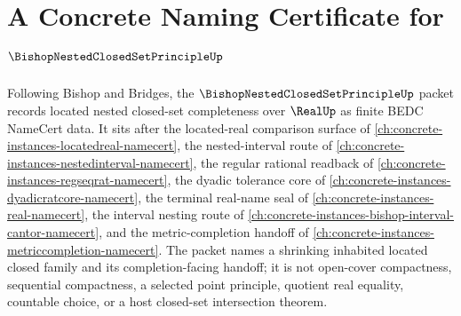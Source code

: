 \chapter{A Concrete Naming Certificate for $\BishopNestedClosedSetPrincipleUp$}
\label{ch:concrete-instances-bishop-nested-closed-set-principle-namecert}

Following Bishop and Bridges, the $\BishopNestedClosedSetPrincipleUp$ packet records located nested closed-set completeness over $\RealUp$ as finite BEDC NameCert data. It sits after the located-real comparison surface of \autoref{ch:concrete-instances-locatedreal-namecert}, the nested-interval route of \autoref{ch:concrete-instances-nestedinterval-namecert}, the regular rational readback of \autoref{ch:concrete-instances-regseqrat-namecert}, the dyadic tolerance core of \autoref{ch:concrete-instances-dyadicratcore-namecert}, the terminal real-name seal of \autoref{ch:concrete-instances-real-namecert}, the interval nesting route of \autoref{ch:concrete-instances-bishop-interval-cantor-namecert}, and the metric-completion handoff of \autoref{ch:concrete-instances-metriccompletion-namecert}. The packet names a shrinking inhabited located closed family and its completion-facing handoff; it is not open-cover compactness, sequential compactness, a selected point principle, quotient real equality, countable choice, or a host closed-set intersection theorem.

